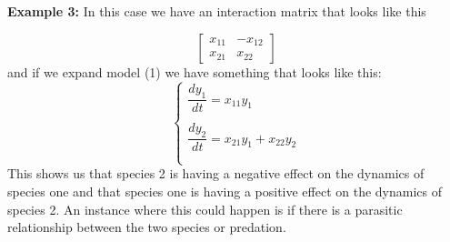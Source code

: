 \documentclass{article}
\begin{document}
\textbf{Example 3:} \hfill\break\hfill\break
In this case we have an interaction matrix that looks like this

$$
\begin{bmatrix}
x_{11}&-x_{12} \\
x_{21}&x_{22} 
\end{bmatrix}
$$
\hfill\break
and if we expand model (1) we have something that looks like this:
\begin{equation}
\begin{cases}
\dfrac{dy_1}{dt}=x_{11}y_1\\\\
\dfrac{dy_2}{dt}=x_{21}y_1+x_{22}y_2\\\\
\end{cases}
\end{equation}
This shows us that species 2 is having a negative effect on the dynamics of species one and that species one is having a positive effect on the dynamics of species 2. An instance where this could happen is if there is a parasitic relationship between the two species or predation.
\hfill\break
\end{document}
